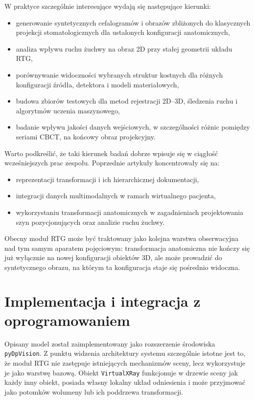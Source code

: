 \documentclass[11pt,a4paper]{article}
\begin{document}
W praktyce szczególnie interesujące wydają się następujące kierunki:
\begin{itemize}
\item generowanie syntetycznych cefalogramów i obrazów zbliżonych do klasycznych
      projekcji stomatologicznych dla ustalonych konfiguracji anatomicznych,
\item analiza wpływu ruchu żuchwy na obraz 2D przy stałej geometrii układu RTG,
\item porównywanie widoczności wybranych struktur kostnych dla różnych
      konfiguracji źródła, detektora i modeli materiałowych,
\item budowa zbiorów testowych dla metod rejestracji 2D--3D, śledzenia ruchu
      i algorytmów uczenia maszynowego,
\item badanie wpływu jakości danych wejściowych, w szczególności różnic pomiędzy
      seriami CBCT, na końcowy obraz projekcyjny.
\end{itemize}

Warto podkreślić, że taki kierunek badań dobrze wpisuje się w ciągłość
wcześniejszych prac zespołu. Poprzednie artykuły koncentrowały się na:
\begin{itemize}
\item reprezentacji transformacji i ich hierarchicznej dokumentacji,
\item integracji danych multimodalnych w ramach wirtualnego pacjenta,
\item wykorzystaniu transformacji anatomicznych w zagadnieniach projektowania
      szyn pozycjonujących oraz analizie ruchu żuchwy.
\end{itemize}
Obecny moduł RTG może być traktowany jako kolejna warstwa obserwacyjna nad tym
samym aparatem pojęciowym: transformacja anatomiczna nie kończy się już wyłącznie
na nowej konfiguracji obiektów 3D, ale może prowadzić do syntetycznego obrazu,
na którym ta konfiguracja staje się pośrednio widoczna.

\section{Implementacja i integracja z oprogramowaniem}

Opisany model został zaimplementowany jako rozszerzenie środowiska
\texttt{pyDpVision}. Z punktu widzenia architektury systemu szczególnie istotne
jest to, że moduł RTG nie zastępuje istniejących mechanizmów sceny, lecz wykorzystuje
je jako warstwę bazową. Obiekt \texttt{VirtualXRay} funkcjonuje w drzewie sceny
jak każdy inny obiekt, posiada własny lokalny układ odniesienia i może przyjmować
jako potomków wolumeny lub ich poddrzewa transformacji.
\end{document}
